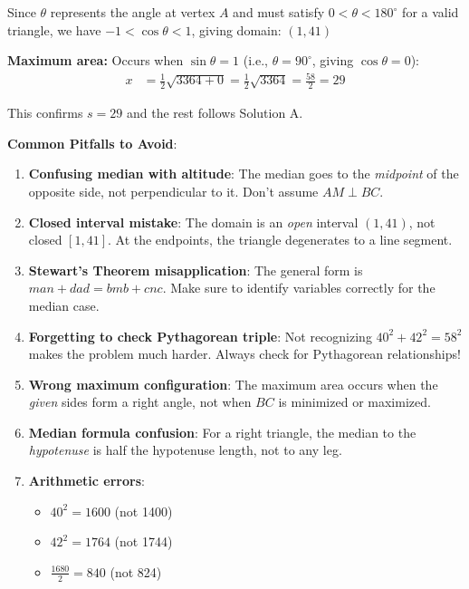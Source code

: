 \documentclass[12pt]{article}
\begin{document}
\begin{solutionbox}
Since $\theta$ represents the angle at vertex $A$ and must satisfy $0 < \theta < 180^{\circ}$ for a valid triangle, we have $-1 < \cos\theta < 1$, giving domain: $(1, 41)$ \checkmark

\textbf{Maximum area:} Occurs when $\sin\theta = 1$ (i.e., $\theta = 90^{\circ}$, giving $\cos\theta = 0$):
\begin{align*}
    x &= \frac{1}{2}\sqrt{3364 + 0} = \frac{1}{2}\sqrt{3364} = \frac{58}{2} = 29
\end{align*}

This confirms $s = 29$ and the rest follows Solution A.

\end{solutionbox}

\begin{warningbox}
\textbf{Common Pitfalls to Avoid}:

\begin{enumerate}
    \item \textbf{Confusing median with altitude}: The median goes to the \textit{midpoint} of the opposite side, not perpendicular to it. Don't assume $AM \perp BC$.
    
    \item \textbf{Closed interval mistake}: The domain is an \textit{open} interval $(1, 41)$, not closed $[1, 41]$. At the endpoints, the triangle degenerates to a line segment.
    
    \item \textbf{Stewart's Theorem misapplication}: The general form is $man + dad = bmb + cnc$. Make sure to identify variables correctly for the median case.
    
    \item \textbf{Forgetting to check Pythagorean triple}: Not recognizing $40^2 + 42^2 = 58^2$ makes the problem much harder. Always check for Pythagorean relationships!
    
    \item \textbf{Wrong maximum configuration}: The maximum area occurs when the \textit{given} sides form a right angle, not when $BC$ is minimized or maximized.
    
    \item \textbf{Median formula confusion}: For a right triangle, the median to the \textit{hypotenuse} is half the hypotenuse length, not to any leg.
    
    \item \textbf{Arithmetic errors}:
    \begin{itemize}
        \item $40^2 = 1600$ (not 1400)
        \item $42^2 = 1764$ (not 1744)
        \item $\frac{1680}{2} = 840$ (not 824)
    \end{itemize}
    

\end{enumerate}
\end{warningbox}
\end{document}
